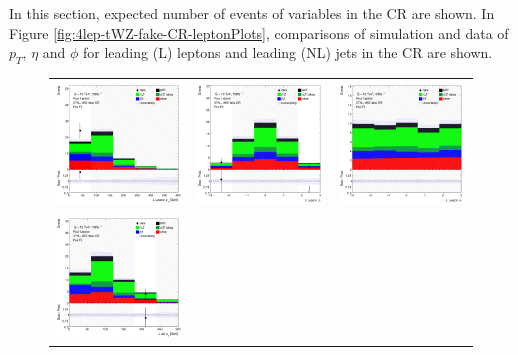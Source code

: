 
In this section, expected number of events of variables in the \tWZfake CR are shown. In Figure \ref{fig:4lep-tWZ-fake-CR-leptonPlots}, comparisons of simulation and data of $p_{T}$, $\eta$ and $\phi$ for leading (L) leptons and leading (NL) jets in the \tWZfake CR are shown.
\begin{figure}[htbp]
\centering
  \begin{tabular}{ccc}


    \includegraphics[width=.25\textwidth]{figures/PreFitPlots/lep4_tWZ_3T1L_L_lepton_pt.png} &
    \includegraphics[width=.25\textwidth]{figures/PreFitPlots/lep4_tWZ_3T1L_L_lepton_eta.png} &
    \includegraphics[width=.25\textwidth]{figures/PreFitPlots/lep4_tWZ_3T1L_L_lepton_phi.png} \\
    \includegraphics[width=.25\textwidth]{figures/PreFitPlots/lep4_tWZ_3T1L_LJet_pt.png} &

\end{tabular}
\end{figure}
